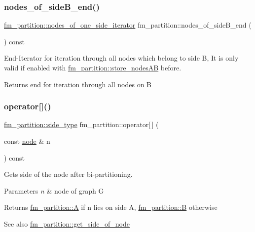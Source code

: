\subsubsection{\texorpdfstring{nodes\+\_\+of\+\_\+side\+B\+\_\+end()}{nodes\_of\_sideB\_end()}}
{\footnotesize\ttfamily \mbox{\hyperlink{classfm__partition_ac8b7b5253476118e5f7bbad2fe8af285}{fm\+\_\+partition\+::nodes\+\_\+of\+\_\+one\+\_\+side\+\_\+iterator}} fm\+\_\+partition\+::nodes\+\_\+of\+\_\+side\+B\+\_\+end (\begin{DoxyParamCaption}{ }\end{DoxyParamCaption}) const}

End-\/\+Iterator for iteration through all nodes which belong to side {\ttfamily B}, It is only valid if enabled with \mbox{\hyperlink{classfm__partition_a8926005b4637055d2acf6f29ad2d9b97}{fm\+\_\+partition\+::store\+\_\+nodes\+AB}} before.

\begin{DoxyReturn}{Returns}
end for iteration through all nodes on {\ttfamily B} 
\end{DoxyReturn}
\mbox{\label{classfm__partition_a45ef6bc577ce894ead2c699678e26f1b}} 
\subsubsection{\texorpdfstring{operator[]()}{operator[]()}}
{\footnotesize\ttfamily \mbox{\hyperlink{classfm__partition_a7cdff1bea3740a287387e8408e16ca79}{fm\+\_\+partition\+::side\+\_\+type}} fm\+\_\+partition\+::operator\mbox{[}$\,$\mbox{]} (\begin{DoxyParamCaption}\item[{const \mbox{\hyperlink{classnode}{node}} \&}]{n }\end{DoxyParamCaption}) const}

Gets side of the node after bi-\/partitioning.


\begin{DoxyParams}{Parameters}
{\em n} & node of graph {\ttfamily G} \\
\hline
\end{DoxyParams}
\begin{DoxyReturn}{Returns}
{\ttfamily \mbox{\hyperlink{classfm__partition_a973d30e9eb0d21f659ef288176cd4791}{fm\+\_\+partition\+::A}}} if {\ttfamily n} lies on side {\ttfamily A}, {\ttfamily \mbox{\hyperlink{classfm__partition_a42515c44eecb7ba3e2ec549a877ef238}{fm\+\_\+partition\+::B}}} otherwise 
\end{DoxyReturn}
\begin{DoxySeeAlso}{See also}
\mbox{\hyperlink{classfm__partition_af5f6ad817fe30760f3bc5470bd70c4c9}{fm\+\_\+partition\+::get\+\_\+side\+\_\+of\+\_\+node}} 
\end{DoxySeeAlso}
\mbox{\label{classfm__partition_a05ba0de86d7fe9c2de81b0681d8e0102}} 
